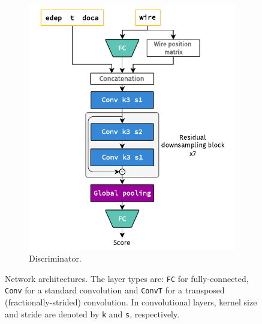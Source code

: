 \begin{figure}
    \begin{subfigure}[t]{0.49\textwidth}
        \centering
        \includegraphics[width=\textwidth]{chapter4/network_architectures_disc.drawio.pdf}
        \hspace{-1cm} %
        \caption{Discriminator.}
    \end{subfigure}
    \caption{Network architectures. The layer types are: \texttt{FC} for
        fully-connected, \texttt{Conv} for a standard convolution and
        \texttt{ConvT} for a transposed (fractionally-strided) convolution. In
        convolutional layers, kernel size and stride are denoted by \texttt{k}
        and \texttt{s}, respectively.}
    \label{fig:architectures}
\end{figure}

